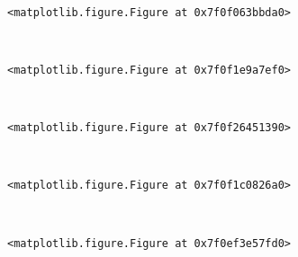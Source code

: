 \documentclass[11pt]{article}
\begin{document}
    
    \begin{center}
    \end{center}
    { \hspace*{\fill} \\}
    
    
    \begin{verbatim}
<matplotlib.figure.Figure at 0x7f0f063bbda0>
    \end{verbatim}

    
    \begin{center}
    \end{center}
    { \hspace*{\fill} \\}
    
    
    \begin{verbatim}
<matplotlib.figure.Figure at 0x7f0f1e9a7ef0>
    \end{verbatim}

    
    \begin{center}
    \end{center}
    { \hspace*{\fill} \\}
    
    
    \begin{verbatim}
<matplotlib.figure.Figure at 0x7f0f26451390>
    \end{verbatim}

    
    \begin{center}
    \end{center}
    { \hspace*{\fill} \\}
    
    
    \begin{verbatim}
<matplotlib.figure.Figure at 0x7f0f1c0826a0>
    \end{verbatim}

    
    \begin{center}
    \end{center}
    { \hspace*{\fill} \\}
    
    
    \begin{verbatim}
<matplotlib.figure.Figure at 0x7f0ef3e57fd0>
    \end{verbatim}
\end{document}
